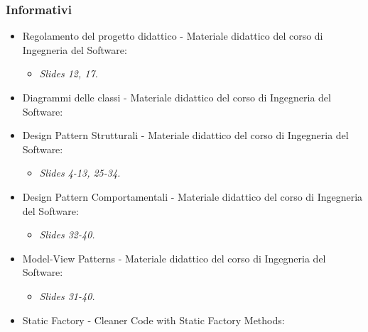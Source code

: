 \subsubsection{Informativi}
\begin{itemize}
\item Regolamento del progetto didattico - Materiale didattico del corso di Ingegneria del Software:
\newline {}
\begin{itemize}
\item \textit{Slides 12, 17.}
\end{itemize}
\item Diagrammi delle classi - Materiale didattico del corso di Ingegneria del Software:
\newline {}
\item Design Pattern Strutturali - Materiale didattico del corso di Ingegneria del Software:
\newline {}
\begin{itemize}
\item \textit{Slides 4-13, 25-34.}
\end{itemize}
\item Design Pattern Comportamentali - Materiale didattico del corso di Ingegneria del Software:
\newline {}
\begin{itemize}
\item \textit{Slides 32-40.}
\end{itemize}
\item Model-View Patterns - Materiale didattico del corso di Ingegneria del Software:
\newline {}
\begin{itemize}
\item \textit{Slides 31-40.}
\end{itemize}
\item Static Factory - Cleaner Code with Static Factory Methods:
\newline {}
\end{itemize}